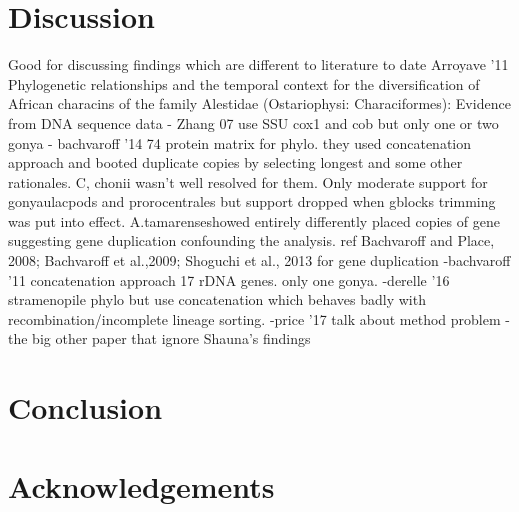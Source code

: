 \documentclass[12pt]{article}
\begin{document}
\section{Discussion}
Good for discussing findings which are different to literature to date Arroyave '11 Phylogenetic relationships and the temporal context for the diversification
of African characins of the family Alestidae (Ostariophysi: Characiformes): Evidence from DNA sequence data
- Zhang 07 use SSU cox1 and cob but only one or two gonya
- bachvaroff '14 74 protein matrix for phylo. they used concatenation approach and booted duplicate copies by selecting longest and some other rationales. C, chonii wasn't well resolved for them. Only moderate support for gonyaulacpods and prorocentrales but support dropped when gblocks trimming was put into effect. A.tamarenseshowed entirely differently placed copies of gene suggesting gene duplication confounding the analysis.  ref Bachvaroff and Place, 2008; Bachvaroff et al.,2009; Shoguchi et al., 2013 for gene duplication
-bachvaroff '11 concatenation approach 17 rDNA genes. only one gonya.
-derelle '16 stramenopile phylo but use concatenation which behaves badly with recombination/incomplete lineage sorting.
-price '17 talk about method problem
- the big other paper that ignore Shauna's findings




\newpage
\section{Conclusion}
\newpage

\section{Acknowledgements}


\end{document}
